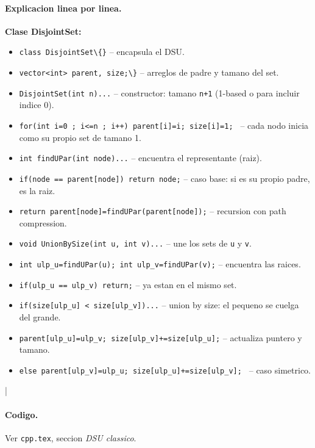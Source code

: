 \paragraph{Explicacion linea por linea.}
\textbf{Clase DisjointSet:}
\begin{itemize}\setlength\itemsep{0pt}
	\item \verb|class DisjointSet\{}| -- encapsula el DSU.
	\item \verb|vector<int> parent, size;\}| -- arreglos de padre y tamano del set.
	\item \texttt{DisjointSet(int n){...}} -- constructor: tamano \texttt{n+1} (1-based o para incluir indice 0).
	\item \texttt{for(int i=0 ; i<=n ; i++){ parent[i]=i; size[i]=1; }} -- cada nodo inicia como su propio set de tamano 1.
	\item \texttt{int findUPar(int node){...}} -- encuentra el representante (raiz).
	\item \texttt{if(node == parent[node]) return node;} -- caso base: si es su propio padre, es la raiz.
	\item \texttt{return parent[node]=findUPar(parent[node]);} -- recursion con path compression.
	\item \texttt{void UnionBySize(int u, int v){...}} -- une los sets de \texttt{u} y \texttt{v}.
	\item \texttt{int ulp\_u=findUPar(u); int ulp\_v=findUPar(v);} -- encuentra las raices.
	\item \texttt{if(ulp\_u == ulp\_v) return;} -- ya estan en el mismo set.
	\item \texttt{if(size[ulp\_u] < size[ulp\_v]){...}} -- union by size: el pequeno se cuelga del grande.
	\item \texttt{parent[ulp\_u]=ulp\_v; size[ulp\_v]+=size[ulp\_u];} -- actualiza puntero y tamano.
	\item \texttt{else{ parent[ulp\_v]=ulp\_u; size[ulp\_u]+=size[ulp\_v]; }} -- caso simetrico.
\end{itemize}
|\paragraph{Codigo.}
Ver \texttt{cpp.tex}, seccion \textit{DSU classico}.

\vspace{0.5em|||}
